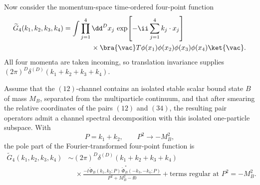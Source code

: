 Now consider the momentum-space time-ordered four-point function
\[
\begin{aligned}
  \widetilde G_4(k_1,k_2,k_3,k_4)
  &=
  \int\prod_{j=1}^4\dd^D x_j\,
  \exp\!\left[-\ii\sum_{j=1}^4 k_j\cdot x_j\right]
\\
  &\qquad\qquad\times
  \bra{\vac}T\phi(x_1)\phi(x_2)\phi(x_3)\phi(x_4)\ket{\vac} .
\end{aligned}
\]
All four momenta are taken incoming, so translation invariance supplies
\((2\pi)^D\delta^{(D)}(k_1+k_2+k_3+k_4)\).

\begin{theorem}
\label{thm:bethe-salpeter-pole-factorization}
Assume that the \((12)\)-channel contains an isolated stable scalar bound
state \(B\) of mass \(M_B\), separated from the multiparticle continuum, and
that after smearing the relative coordinates of the pairs \((12)\) and
\((34)\), the resulting pair operators admit a channel spectral
decomposition with this isolated one-particle subspace.  With
\[
  P=k_1+k_2,\qquad P^2\to -M_B^2,
\]
the pole part of the Fourier-transformed four-point function is
\begin{equation}
\begin{aligned}
  \widetilde G_4(k_1,k_2,k_3,k_4)
  &\sim
  (2\pi)^D\delta^{(D)}(k_1+k_2+k_3+k_4)
\\
  &\quad\times
  \frac{-\ii\,
    \widetilde\Phi_B(k_1,k_2;P)\,
    \widetilde\Phi_B^*(-k_3,-k_4;P)}
       {P^2+M_B^2-\ii0}
  +\text{terms regular at }P^2=-M_B^2 .
\end{aligned}
  \label{eq:bethe-salpeter-four-point-pole-factorization}
\end{equation}
\end{theorem}

